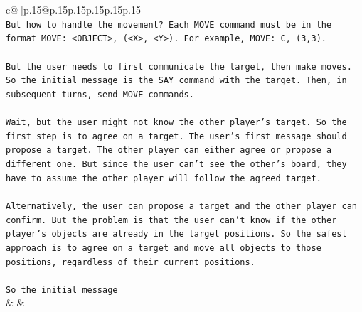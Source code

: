 \documentclass{article}
\begin{document}
{\begin{supertabular}{c@{$\;$}|p{.15\linewidth}@{}p{.15\linewidth}p{.15\linewidth}p{.15\linewidth}p{.15\linewidth}p{.15\linewidth}}
{{{\\ 
\texttt{But how to handle the movement? Each MOVE command must be in the format MOVE: <OBJECT>, (<X>, <Y>). For example, MOVE: C, (3,3).} \\
\\ 
\texttt{But the user needs to first communicate the target, then make moves. So the initial message is the SAY command with the target. Then, in subsequent turns, send MOVE commands.} \\
\\ 
\texttt{Wait, but the user might not know the other player's target. So the first step is to agree on a target. The user's first message should propose a target. The other player can either agree or propose a different one. But since the user can't see the other's board, they have to assume the other player will follow the agreed target.} \\
\\ 
\texttt{Alternatively, the user can propose a target and the other player can confirm. But the problem is that the user can't know if the other player's objects are already in the target positions. So the safest approach is to agree on a target and move all objects to those positions, regardless of their current positions.} \\
\\ 
\texttt{So the initial message} \\
            }
        }
    }
    & & \\ \\


\end{supertabular}}
\end{document}
